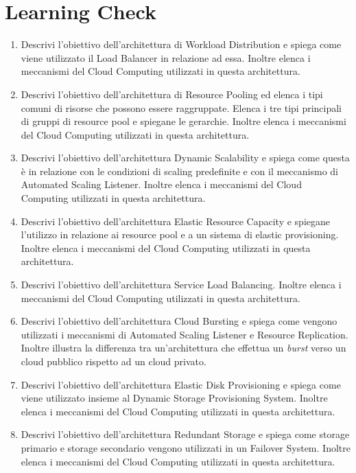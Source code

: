 \section{Learning Check}
\begin{enumerate}
    \item Descrivi l'obiettivo dell'architettura di Workload Distribution e spiega come viene utilizzato il Load Balancer in relazione ad essa. Inoltre elenca i meccanismi del Cloud Computing utilizzati in questa architettura.
    \item Descrivi l'obiettivo dell'architettura di Resource Pooling ed elenca i tipi comuni di risorse che possono essere raggruppate. Elenca i tre tipi principali di gruppi di resource pool e spiegane le gerarchie. Inoltre elenca i meccanismi del Cloud Computing utilizzati in questa architettura.
    \item Descrivi l'obiettivo dell'architettura Dynamic Scalability e spiega come questa è in relazione con le condizioni di scaling predefinite e con il meccanismo di Automated Scaling Listener. Inoltre elenca i meccanismi del Cloud Computing utilizzati in questa architettura.
    \item Descrivi l'obiettivo dell'architettura Elastic Resource Capacity e spiegane l'utilizzo in relazione ai resource pool e a un sistema di elastic provisioning. Inoltre elenca i meccanismi del Cloud Computing utilizzati in questa architettura.
    \item Descrivi l'obiettivo dell'architettura Service Load Balancing. Inoltre elenca i meccanismi del Cloud Computing utilizzati in questa architettura.
    \item Descrivi l'obiettivo dell'architettura Cloud Bursting e spiega come vengono utilizzati i meccanismi di Automated Scaling Listener e Resource Replication. Inoltre illustra la differenza tra un'architettura che effettua un \textit{burst} verso un cloud pubblico rispetto ad un cloud privato.
    \item Descrivi l'obiettivo dell'architettura Elastic Disk Provisioning e spiega come viene utilizzato insieme al Dynamic Storage Provisioning System. Inoltre elenca i meccanismi del Cloud Computing utilizzati in questa architettura.
    \item Descrivi l'obiettivo dell'architettura Redundant Storage e spiega come storage primario e storage secondario vengono utilizzati in un Failover System. Inoltre elenca i meccanismi del Cloud Computing utilizzati in questa architettura.
\end{enumerate}
